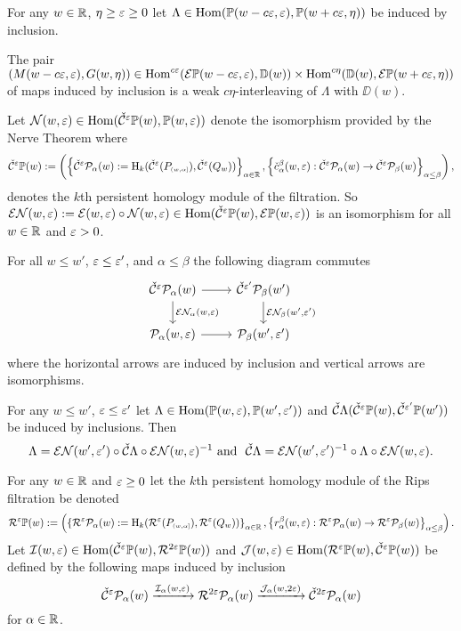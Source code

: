 \begin{lemma}\label{lem:weak_interleave_right}
  For any $w\in\R$, $\eta\geq \e \geq 0$ let $\Lambda\in\Hom(\PP(w-c\e,\e),\PP(w+c\e,\eta))$ be induced by inclusion.

  The pair $(M(w-c\e,\e), G(w,\eta))\in \Hom^{c\e}(\ext{\PP(w-c\e,\e)}, \DD(w))\times\Hom^{c\eta}(\DD(w), \ext{\PP(w+c\e,\eta)})$ of maps induced by inclusion is a weak $c\eta$-interleaving of $\Lambda$ with $\DD(w)$.
\end{lemma}


Let $\N(w,\e)\in\Hom(\cech^\e\PP(w), \PP(w,\e))$
denote the isomorphism provided by the Nerve Theorem where
\[\cech^\e\PP(w) := \left(\left\{\cech^\e\P_\alpha(w) := \hom_k(\cech^\e(P\subi{w,\alpha}),\cech^\e(Q_w))\right\}_{\alpha\in\R}, \left\{\check{c}_\alpha^\beta(w,\e) : \cech^\e\P_\alpha(w)\to\cech^\e\P_\beta(w)\right\}_{\alpha\leq\beta}\right),\]
denotes the $k$th persistent homology module of the \Cech filtration.
So $\E\N(w,\e) := \E(w,\e)\circ \N(w,\e)\in\Hom(\cech^\e\PP(w), \ext{\PP(w,\e)})$ is an isomorphism for all $w\in\R$ and $\e > 0$.

\begin{lemma}\label{lem:excisive_nerve}
  For all $w\leq w'$, $\e\leq\e'$, and $\alpha\leq\beta$ the following diagram commutes
  \begin{equation}\begin{tikzcd}
    \cech^\e\P_\alpha(w)\arrow{r}\arrow{d}{\E\N_\alpha(w,\e)} &
    \cech^{\e'}\P_\beta(w')\arrow{d}{\E\N_\beta(w',\e')}\\
    \P_\alpha(w,\e)\arrow{r} &
    \P_\beta(w',\e')
  \end{tikzcd}\end{equation}
  where the horizontal arrows are induced by inclusion and vertical arrows are isomorphisms.
\end{lemma}

\begin{corollary}\label{cor:excisive_nerve}
 For any $w\leq w'$, $\e\leq\e'$ let $\Lambda\in\Hom(\PP(w,\e),\PP(w',\e'))$ and $\cech\Lambda(\cech^{\e}\PP(w),\cech^{\e'}\PP(w'))$ be induced by inclusions.
 Then
 \[\Lambda = \E\N(w',\e')\circ \cech\Lambda\circ \E\N(w,\e)^{-1}\text{ and }\ \cech\Lambda = \E\N(w',\e')^{-1}\circ \Lambda\circ \E\N(w,\e).\]
\end{corollary}

For any $w\in\R$ and $\e\geq 0$ let the $k$th persistent homology module of the Rips filtration be denoted
\[\rips^\e\PP(w) := \left(\left\{\rips^\e\P_\alpha(w) := \hom_k(\rips^\e(P\subi{w,\alpha}),\rips^\e(Q_w))\right\}_{\alpha\in\R}, \left\{r_\alpha^\beta(w,\e) : \rips^\e\P_\alpha(w)\to\rips^\e\P_\beta(w)\right\}_{\alpha\leq\beta}\right).\]
Let $\I(w,\e)\in\Hom(\cech^\e\PP(w), \rips^{2\e}\PP(w))$ and $\J(w,\e)\in\Hom(\rips^{\e}\PP(w),\cech^\e\PP(w))$ be defined by the following maps induced by inclusion
\[ \cech^\e\P_\alpha(w)\xrightarrow{\I_\alpha(w,\e)} \rips^{2\e}\P_\alpha(w)\xrightarrow{\J_\alpha(w,2\e)}\cech^{2\e}\P_\alpha(w)\]
for $\alpha\in\R$.

